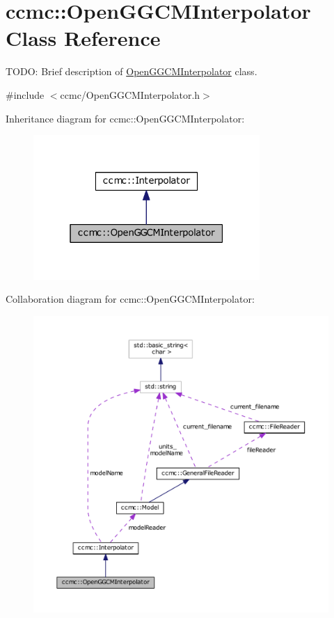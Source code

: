 \hypertarget{classccmc_1_1_open_g_g_c_m_interpolator}{\section{ccmc\-:\-:Open\-G\-G\-C\-M\-Interpolator Class Reference}
\label{classccmc_1_1_open_g_g_c_m_interpolator}
}


T\-O\-D\-O\-: Brief description of \hyperlink{classccmc_1_1_open_g_g_c_m_interpolator}{Open\-G\-G\-C\-M\-Interpolator} class.  




{\ttfamily \#include $<$ccmc/\-Open\-G\-G\-C\-M\-Interpolator.\-h$>$}



Inheritance diagram for ccmc\-:\-:Open\-G\-G\-C\-M\-Interpolator\-:
\nopagebreak
\begin{figure}[H]
\begin{center}
\leavevmode
\includegraphics[width=244pt]{classccmc_1_1_open_g_g_c_m_interpolator__inherit__graph}
\end{center}
\end{figure}


Collaboration diagram for ccmc\-:\-:Open\-G\-G\-C\-M\-Interpolator\-:
\nopagebreak
\begin{figure}[H]
\begin{center}
\leavevmode
\includegraphics[width=350pt]{classccmc_1_1_open_g_g_c_m_interpolator__coll__graph}
\end{center}
\end{figure}
